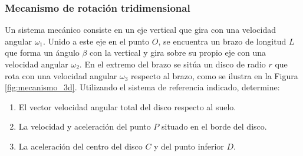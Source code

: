 \subsubsection{Mecanismo de rotación tridimensional}
Un sistema mecánico consiste en un eje vertical que gira con una velocidad angular $\omega_1$. Unido a este eje en el punto $O$, se encuentra un brazo de longitud $L$ que forma un ángulo $\beta$ con la vertical y gira sobre su propio eje con una velocidad angular $\omega_2$. En el extremo del brazo se sitúa un disco de radio $r$ que rota con una velocidad angular $\omega_3$ respecto al brazo, como se ilustra en la Figura \ref{fig:mecanismo_3d}. Utilizando el sistema de referencia indicado, determine:

\begin{enumerate}
    \item El vector velocidad angular total del disco respecto al suelo.
    \item La velocidad y aceleración del punto $P$ situado en el borde del disco.
    \item La aceleración del centro del disco $C$ y del punto inferior $D$.
\end{enumerate}

